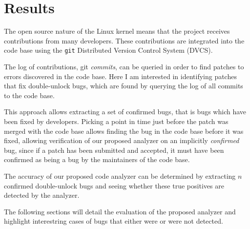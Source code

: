 \section{Results}

\newpar The open source nature of the Linux kernel means that the project receives contributions from many developers. These contributions are integrated into the code base using the \texttt{git} Distributed Version Control System (DVCS). 

\newpar The log of contributions, git \textit{commits}, can be queried in order to find patches to errors discovered in the code base. Here I am interested in identifying patches that fix double-unlock bugs, which are found by querying the log of all commits to the code base. 

\newpar This approach allows extracting a set of confirmed bugs, that is bugs which have been fixed by developers. Picking a point in time just before the patch was merged with the code base allows finding the bug in the code base before it was fixed, allowing verification of our proposed analyzer on an implicitly \textit{confirmed} bug, since if a patch has been submitted and accepted, it must have been confirmed as being a bug by the maintainers of the code base.

\newpar The accuracy of our proposed code analyzer can be determined by extracting $n$ confirmed double-unlock bugs and seeing whether these true positives are detected by the analyzer. 

\newpar The following sections will detail the evaluation of the proposed analyzer and highlight interestring cases of bugs that either were or were not detected. 